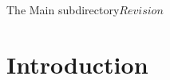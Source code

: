 %   

\begin{cactuspart}{5}{The Main subdirectory}{}{$Revision$}
\renewcommand{\thepage}{\Alph{part}\arabic{page}}

\chapter{Introduction}


\end{cactuspart}
